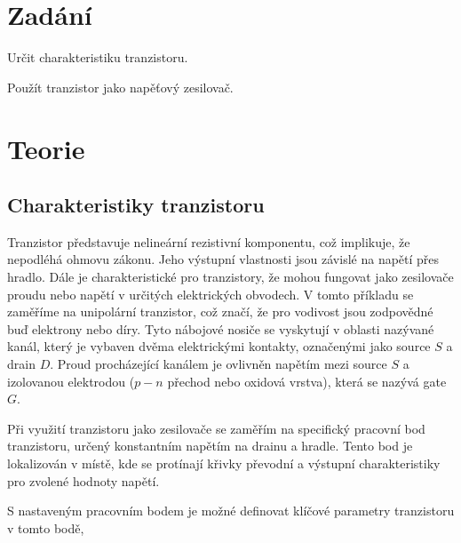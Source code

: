 \documentclass[a4paper,11pt]{article}
\begin{document}
\vskip1cm
    \begin{minipage}[t]{0.5\textwidth} 
        \section{Zadání}
            Určit charakteristiku tranzistoru.
            \par Použít tranzistor jako napěťový zesilovač.
        \section{Teorie}
            \subsection{Charakteristiky tranzistoru}
                Tranzistor představuje nelineární rezistivní komponentu, což implikuje, že nepodléhá ohmovu zákonu. Jeho výstupní vlastnosti jsou závislé na napětí přes hradlo. Dále je charakteristické pro tranzistory, že mohou fungovat jako zesilovače proudu nebo napětí v určitých elektrických obvodech. V tomto příkladu se zaměříme na unipolární tranzistor, což značí, že pro vodivost jsou zodpovědné buď elektrony nebo díry. Tyto nábojové nosiče se vyskytují v oblasti nazývané kanál, který je vybaven dvěma elektrickými kontakty, označenými jako source $S$ a drain $D$. Proud procházející kanálem je ovlivněn napětím mezi source $S$ a izolovanou elektrodou ($p-n$ přechod nebo oxidová vrstva), která se nazývá gate $G$.
                \par Při využití tranzistoru jako zesilovače se zaměřím na specifický pracovní bod tranzistoru, určený konstantním napětím na drainu a hradle. Tento bod je lokalizován v místě, kde se protínají křivky převodní a výstupní charakteristiky pro zvolené hodnoty napětí.
                \par S nastaveným pracovním bodem je možné definovat klíčové parametry tranzistoru v tomto bodě,
    \end{minipage}
    \hspace{10pt}
\end{document}
